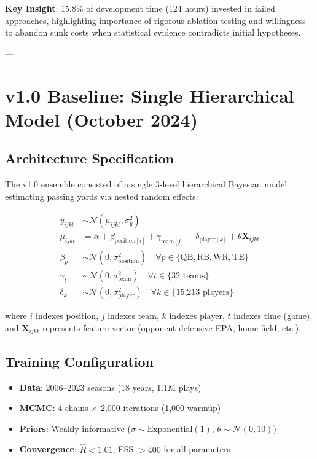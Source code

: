 \textbf{Key Insight}: 15.8\% of development time (124 hours) invested in failed approaches, highlighting importance of rigorous ablation testing and willingness to abandon sunk costs when statistical evidence contradicts initial hypotheses.

---

\section{v1.0 Baseline: Single Hierarchical Model (October 2024)}

\subsection{Architecture Specification}

The v1.0 ensemble consisted of a single 3-level hierarchical Bayesian model estimating passing yards via nested random effects:

\begin{equation}
\begin{aligned}
y_{ijkt} &\sim \mathcal{N}(\mu_{ijkt}, \sigma^2_y) \\
\mu_{ijkt} &= \alpha + \beta_{\text{position}[i]} + \gamma_{\text{team}[j]} + \delta_{\text{player}[k]} + \theta \mathbf{X}_{ijkt} \\
\beta_p &\sim \mathcal{N}(0, \sigma^2_{\text{position}}) \quad \forall p \in \{\text{QB}, \text{RB}, \text{WR}, \text{TE}\} \\
\gamma_t &\sim \mathcal{N}(0, \sigma^2_{\text{team}}) \quad \forall t \in \{\text{32 teams}\} \\
\delta_k &\sim \mathcal{N}(0, \sigma^2_{\text{player}}) \quad \forall k \in \{\text{15,213 players}\}
\end{aligned}
\label{eq:v1-hierarchical}
\end{equation}

where $i$ indexes position, $j$ indexes team, $k$ indexes player, $t$ indexes time (game), and $\mathbf{X}_{ijkt}$ represents feature vector (opponent defensive EPA, home field, etc.).

\subsection{Training Configuration}

\begin{itemize}
\item \textbf{Data}: 2006--2023 seasons (18 years, 1.1M plays)
\item \textbf{MCMC}: 4 chains × 2,000 iterations (1,000 warmup)
\item \textbf{Priors}: Weakly informative ($\sigma \sim \text{Exponential}(1)$, $\theta \sim \mathcal{N}(0, 10)$)
\item \textbf{Convergence}: $\hat{R} < 1.01$, ESS $> 400$ for all parameters
\end{itemize}

